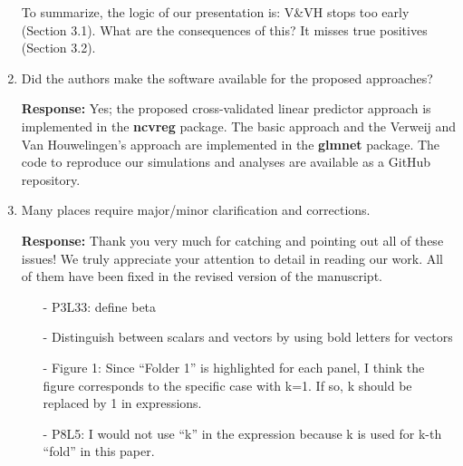 \documentclass{article}
\newcommand{\re}{\textbf{Response: }}
\newcommand{\bbeta}{\boldsymbol{\beta}}
\begin{document}
\begin{enumerate}[align = left]
  To summarize, the logic of our presentation is: V\&VH stops too early (Section 3.1). What are the consequences of this? It misses true positives (Section 3.2).
  
\item Did the authors make the software available for the proposed approaches?

\re Yes; the proposed cross-validated linear predictor approach is implemented in the \textbf{ncvreg} package. The basic approach and the Verweij and Van Houwelingen's approach are implemented in the \textbf{glmnet} package. The code to reproduce our simulations and analyses are available as a GitHub repository.

\item Many places require major/minor clarification and corrections.

  \re Thank you very much for catching and pointing out all of these issues! We truly appreciate your attention to detail in reading our work. All of them have been fixed in the revised version of the manuscript.

\begin{itemize}[align = left]
\item[-]  P3L33: define beta


\item[-] Distinguish between scalars and vectors by using bold letters for vectors


\item[-] Figure 1: Since “Folder 1” is highlighted for each panel, I think the figure corresponds to the specific case with k=1. If so, k should be replaced by 1 in expressions.


\item[-]  P8L5: I would not use “k” in the expression because k is used for k-th “fold” in this paper.



\end{itemize}
\end{enumerate}
\end{document}
